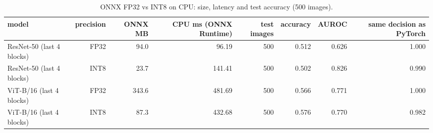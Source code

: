 \begin{table}[t]
\centering
\caption{ONNX FP32 vs INT8 on CPU: size, latency and test accuracy (500 images).}
\label{tab:tab_onnx_int8}
\begin{tabular}{lrrrrrrr}
\toprule
model & precision & ONNX MB & CPU ms (ONNX Runtime) & test images & accuracy & AUROC & same decision as PyTorch \\
\midrule
ResNet-50 (last 4 blocks) & FP32 & 94.0 & 96.19 & 500 & 0.512 & 0.626 & 1.000 \\
ResNet-50 (last 4 blocks) & INT8 & 23.7 & 141.41 & 500 & 0.502 & 0.826 & 0.990 \\
ViT-B/16 (last 4 blocks) & FP32 & 343.6 & 481.69 & 500 & 0.566 & 0.771 & 1.000 \\
ViT-B/16 (last 4 blocks) & INT8 & 87.3 & 432.68 & 500 & 0.576 & 0.770 & 0.982 \\
\bottomrule
\end{tabular}
\end{table}
